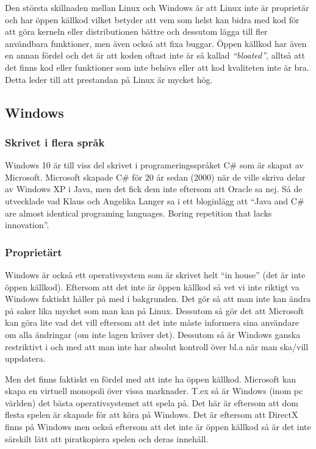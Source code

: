 \documentclass[12pt, a4paper]{report}
\begin{document}
   Den största skillnaden mellan Linux och Windows är att Linux inte är proprietär och har öppen källkod vilket betyder att vem som helst kan bidra med kod för att göra kerneln eller distributionen bättre och dessutom lägga till fler användbara funktioner, men även också att fixa buggar. Öppen källkod har även en annan fördel och det är att koden oftast inte är så kallad \textit{``bloated''}, alltså att det finns kod eller funktioner som inte behövs eller att kod kvaliteten inte är bra. Detta leder till att prestandan på Linux är mycket hög.

   \subsection{Windows}


    \subsubsection{Skrivet i flera språk}
    
    Windows 10 är till viss del skrivet i programeringsspråket C\# som är skapat av Microsoft\cite{c}. Microsoft skapade C\# för 20 år sedan (2000) när de ville skriva delar av Windows XP i Java, men det fick dem inte eftersom att Oracle sa nej. Så de utvecklade vad Klaus och Angelika Langer sa i ett bloginlägg att ``Java and C\# are almost identical programing languages. Boring repetition that lacks innovation''.\cite{cquote}  
    

    \subsubsection{Proprietärt}
    Windows är också ett operativsystem som är skrivet helt ``in house'' (det är inte öppen källkod).
    Eftersom att det inte är öppen källkod så vet vi inte riktigt va Windows faktiskt håller på med i bakgrunden. Det gör så att man inte kan ändra på saker lika mycket som man kan på Linux. Dessutom så gör det att Microsoft kan göra lite vad det vill eftersom att det inte måste informera sina användare om alla ändringar (om inte lagen kräver det). Dessutom så är Windows ganska restriktivt i och med att man inte har absolut kontroll över bl.a när man ska/vill uppdatera.


   Men det finns faktiskt en fördel med att inte ha öppen källkod. Microsoft kan skapa en virtuell monopoli över vissa marknader. T.ex så är Windows (inom pc världen) det bästa operativsystemet att spela på. Det här är eftersom att dom flesta spelen är skapade för att köra på Windows. Det är eftersom att DirectX\cite{directx} finns på Windows men också eftersom att det inte är öppen källkod så är det inte särskilt lätt att piratkopiera spelen och deras innehåll.
\end{document}
